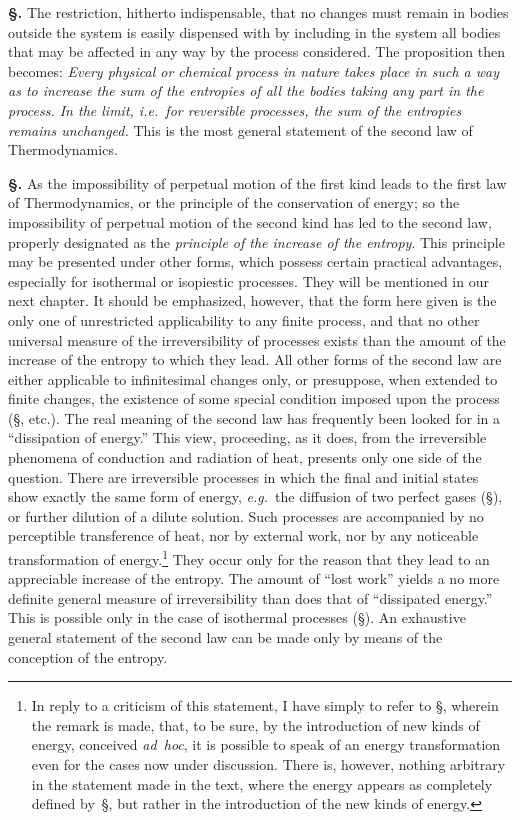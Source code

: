 \documentclass[12pt]{book}[2005/09/16]
\newcommand{\Section}[1]{
  \medskip\par\textbf{§\;#1}
  \label{section:#1}
}
\newcommand{\SecRef}[2][§\;]{\hyperref[section:#2.]{{\upshape #1#2}}}
\newcommand{\PageSep}[1]{\ignorespaces}
\newcommand{\eg}{\emph{e.g.}}
\newcommand{\ie}{\emph{i.e.}}
\begin{document}
\Section{133.} The restriction, hitherto indispensable, that no
%
changes must remain in bodies outside the system is easily
dispensed with by including in the system all bodies that
may be affected in any way by the process considered. The
proposition then becomes: \emph{Every physical or chemical process
in nature takes place in such a way as to increase the sum of
the entropies of all the bodies taking any part in the process.
In the limit, \ie\ for reversible processes, the sum of the
entropies remains unchanged.} This is the most general
statement of the second law of Thermodynamics.

\Section{134.} As the impossibility of perpetual motion of the
first kind leads to the first law of Thermodynamics, or the
principle of the conservation of energy; so the impossibility
of perpetual motion of the second kind has led to the second
law, properly designated as the \emph{principle of the increase of
the entropy}. This principle may be presented under other
forms, which possess certain practical advantages, especially
for isothermal or isopiestic processes. They will be mentioned
in our next chapter. It should be emphasized, however,
that the form here given is the only one of unrestricted
\PageSep{101}
applicability to any finite process, and that no other universal
measure of the irreversibility of processes exists than the
amount of the increase of the entropy to which they lead.
All other forms of the second law are either applicable to
infinitesimal changes only, or presuppose, when extended to
finite changes, the existence of some special condition imposed
upon the process (\SecRef{140}, etc.). The real meaning of
the second law has frequently been looked for in a ``dissipation
of energy.'' This view, proceeding, as it does, from
%
%
the irreversible phenomena of conduction and radiation of
heat, presents only one side of the question. There are
irreversible processes in which the final and initial states
show exactly the same form of energy, \eg\ the diffusion of
two perfect gases (\SecRef{238}), or further dilution of a dilute
solution. Such processes are accompanied by no perceptible
transference of heat, nor by external work, nor by any noticeable
transformation of energy.\footnote
  {In reply to a criticism of this statement, I have simply to refer to
  \SecRef{108}, wherein the remark is made, that, to be sure, by the introduction of
  new kinds of energy, conceived \textit{ad~hoc}, it is possible to speak of an energy
  transformation even for the cases now under discussion. There is, however,
  nothing arbitrary in the statement made in the text, where the energy
  appears as completely defined by~\SecRef{56}, but rather in the introduction of the
  new kinds of energy.}
They occur only for the
reason that they lead to an appreciable increase of the
entropy. The amount of ``lost work'' yields a no more
definite general measure of irreversibility than does that of
``dissipated energy.'' This is possible only in the case of
isothermal processes (\SecRef{143}). An exhaustive general statement
of the second law can be made only by means of the
conception of the entropy.
\end{document}
